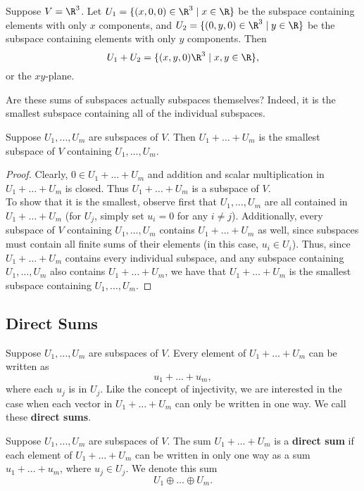 \documentclass[math0540-lecture-notes.tex]{subfiles}
\begin{document}
\begin{example}
  Suppose $V=\R^3$. Let $ U_1=\{(x,0,0)\in \R^3\mid x\in \R\}$ be the subspace containing elements
  with only $x$ components, and $ U_2=\{(0,y,0)\in \R^3\mid y\in \R\} $ be the subspace containing
  elements with only $y$ components. Then \[
    U_1+U_2=\{(x,y,0)\R^3\mid x,y\in \R\} 
  ,\] or the $xy$-plane. 
\end{example}

Are these sums of subspaces actually subspaces themselves? Indeed, it is the smallest subspace
containing all of the individual subspaces.

\begin{proposition}{}
  Suppose $U_1,\ldots,U_m$ are subspaces of $V$. Then $U_1+\ldots+U_m$ is the smallest subspace of
  $V$ containing $U_1,\ldots,U_m$.
\end{proposition}
\begin{proof}[Proof]
  Clearly, $0\in U_1+\ldots+U_m$ and addition and scalar multiplication in $U_1+\ldots+U_m$ is
  closed. Thus  $U_1+\ldots+U_m$ is a subspace of  $V$.\\

  To show that it is the smallest, observe first that $ U_1,\ldots,U_m$ are all contained in
  $U_1+\ldots+U_m$ (for $U_j$, simply set $u_i=0$ for any $i\neq j$). Additionally, every subspace
  of $V$ containing $  U_1,\ldots,U_m$ contains $U_1+\ldots+U_m$ as well, since subspaces must
  contain all finite sums of their elements (in this case, $u_i\in U_i$). Thus, since
  $U_1+\ldots+U_m$ contains every individual subspace, and any subspace containing  $U_1,\ldots,U_m$ 
  also contains $U_1+\ldots+U_m$, we have that  $U_1+\ldots+U_m$ is the smallest subspace containing
   $U_1,\ldots,U_m$.
\end{proof}

\subsection{Direct Sums}
Suppose $ U_1,\ldots,U_m$ are subspaces of $V$. Every element of $U_1+\ldots+U_m$ can be written as
 \[
  u_1+\ldots+u_m
,\]  where each $u_j$ is in $U_j$. Like the concept of injectivity, we are interested in the case
when each vector in $U_1+\ldots+U_m$ can only be written in one way. We call these  \textbf{direct
sums}.

\begin{definition}{}
  Suppose $U_1,\ldots,U_m$ are subspaces of $V$. The sum $U_1+\ldots+U_m$ is a \textbf{direct sum}
  if each element of $U_1+\ldots+U_m$ can be written in only one way as a sum $u_1+\ldots+u_m$,
  where $u_j\in U_j$. We denote this sum \[
    U_1\oplus \ldots\oplus U_m
  .\] 
\end{definition}
\end{document}
